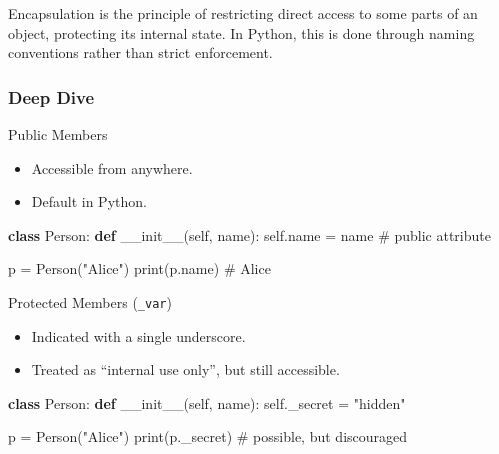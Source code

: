 \documentclass[
  letterpaper,
  DIV=11,
  numbers=noendperiod]{scrreprt}
\newenvironment{Shaded}{\begin{snugshade}}{\end{snugshade}}
\newcommand{\BuiltInTok}[1]{\textcolor[rgb]{0.00,0.23,0.31}{#1}}
\newcommand{\CommentTok}[1]{\textcolor[rgb]{0.37,0.37,0.37}{#1}}
\newcommand{\FunctionTok}[1]{\textcolor[rgb]{0.28,0.35,0.67}{#1}}
\newcommand{\KeywordTok}[1]{\textcolor[rgb]{0.00,0.23,0.31}{\textbf{#1}}}
\newcommand{\NormalTok}[1]{\textcolor[rgb]{0.00,0.23,0.31}{#1}}
\newcommand{\OperatorTok}[1]{\textcolor[rgb]{0.37,0.37,0.37}{#1}}
\newcommand{\StringTok}[1]{\textcolor[rgb]{0.13,0.47,0.30}{#1}}
\newcommand{\VariableTok}[1]{\textcolor[rgb]{0.07,0.07,0.07}{#1}}
\providecommand{\tightlist}{%
  \setlength{\itemsep}{0pt}\setlength{\parskip}{0pt}}
\begin{document}
Encapsulation is the principle of restricting direct access to some
parts of an object, protecting its internal state. In Python, this is
done through naming conventions rather than strict enforcement.

\subsubsection{Deep Dive}\label{deep-dive-67}

Public Members

\begin{itemize}
\tightlist
\item
  Accessible from anywhere.
\item
  Default in Python.
\end{itemize}

\begin{Shaded}
\begin{Highlighting}[]
\KeywordTok{class}\NormalTok{ Person:}
    \KeywordTok{def} \FunctionTok{\_\_init\_\_}\NormalTok{(}\VariableTok{self}\NormalTok{, name):}
        \VariableTok{self}\NormalTok{.name }\OperatorTok{=}\NormalTok{ name   }\CommentTok{\# public attribute}

\NormalTok{p }\OperatorTok{=}\NormalTok{ Person(}\StringTok{"Alice"}\NormalTok{)}
\BuiltInTok{print}\NormalTok{(p.name)   }\CommentTok{\# Alice}
\end{Highlighting}
\end{Shaded}

Protected Members (\texttt{\_var})

\begin{itemize}
\tightlist
\item
  Indicated with a single underscore.
\item
  Treated as ``internal use only'', but still accessible.
\end{itemize}

\begin{Shaded}
\begin{Highlighting}[]
\KeywordTok{class}\NormalTok{ Person:}
    \KeywordTok{def} \FunctionTok{\_\_init\_\_}\NormalTok{(}\VariableTok{self}\NormalTok{, name):}
        \VariableTok{self}\NormalTok{.\_secret }\OperatorTok{=} \StringTok{"hidden"}

\NormalTok{p }\OperatorTok{=}\NormalTok{ Person(}\StringTok{"Alice"}\NormalTok{)}
\BuiltInTok{print}\NormalTok{(p.\_secret)   }\CommentTok{\# possible, but discouraged}
\end{Highlighting}
\end{Shaded}
\end{document}
